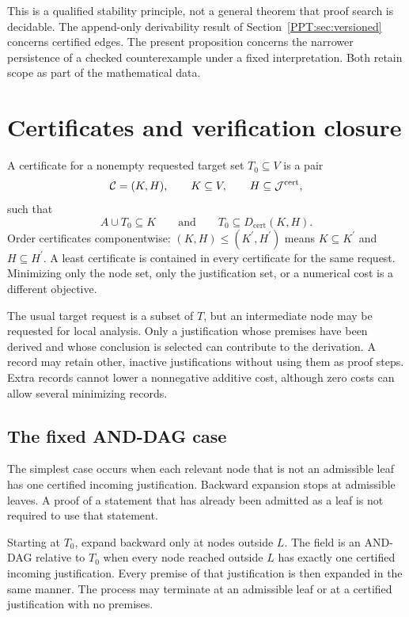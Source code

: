 This is a qualified stability principle, not a general theorem that proof search is decidable. The append-only derivability result of Section~\ref{PPT:sec:versioned} concerns certified edges. The present proposition concerns the narrower persistence of a checked counterexample under a fixed interpretation. Both retain scope as part of the mathematical data.


\section{Certificates and verification closure}
\label{PPT:sec:old4}

\begin{PPTdefinition}[Certificate]
\label{PPT:res:4:1}
A certificate for a nonempty requested target set $T_0\subseteq V$ is a pair
\[
\mathcal C=(K,H),
\qquad K\subseteq V,
\qquad H\subseteq\mathcal J^{\mathrm{cert}},
\]
such that
\[
A\cup T_0\subseteq K
\qquad\text{and}\qquad
T_0\subseteq D_{\mathrm{cert}}(K,H).
\]
Order certificates componentwise: $(K,H)\leq(K^{\prime},H^{\prime})$ means $K\subseteq K^{\prime}$ and $H\subseteq H^{\prime}$. A least certificate is contained in every certificate for the same request. Minimizing only the node set, only the justification set, or a numerical cost is a different objective.
\end{PPTdefinition}

The usual target request is a subset of $T$, but an intermediate node may be requested for local analysis. Only a justification whose premises have been derived and whose conclusion is selected can contribute to the derivation. A record may retain other, inactive justifications without using them as proof steps. Extra records cannot lower a nonnegative additive cost, although zero costs can allow several minimizing records.

\subsection{The fixed AND-DAG case}

The simplest case occurs when each relevant node that is not an admissible leaf has one certified incoming justification. Backward expansion stops at admissible leaves. A proof of a statement that has already been admitted as a leaf is not required to use that statement.

\begin{PPTdefinition}
\label{PPT:res:4:2}
Starting at $T_0$, expand backward only at nodes outside $L$. The field is an AND-DAG relative to $T_0$ when every node reached outside $L$ has exactly one certified incoming justification. Every premise of that justification is then expanded in the same manner. The process may terminate at an admissible leaf or at a certified justification with no premises.
\end{PPTdefinition}

